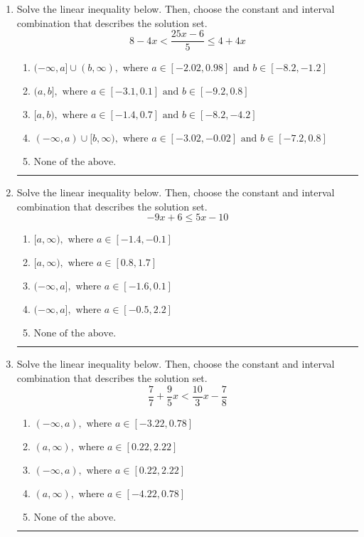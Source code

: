 \documentclass[14pt]{extbook}
\newcommand{\litem}[1]{\item#1\hspace*{-1cm}\rule{\textwidth}{0.4pt}}
\begin{document}
\begin{enumerate}
\litem{
Solve the linear inequality below. Then, choose the constant and interval combination that describes the solution set.\[ 8 - 4 x < \frac{25 x - 6}{5} \leq 4 + 4 x \]\begin{enumerate}[label=\Alph*.]
\item \( (-\infty, a] \cup (b, \infty), \text{ where } a \in [-2.02, 0.98] \text{ and } b \in [-8.2, -1.2] \)
\item \( (a, b], \text{ where } a \in [-3.1, 0.1] \text{ and } b \in [-9.2, 0.8] \)
\item \( [a, b), \text{ where } a \in [-1.4, 0.7] \text{ and } b \in [-8.2, -4.2] \)
\item \( (-\infty, a) \cup [b, \infty), \text{ where } a \in [-3.02, -0.02] \text{ and } b \in [-7.2, 0.8] \)
\item \( \text{None of the above.} \)

\end{enumerate} }
\litem{
Solve the linear inequality below. Then, choose the constant and interval combination that describes the solution set.\[ -9x + 6 \leq 5x -10 \]\begin{enumerate}[label=\Alph*.]
\item \( [a, \infty), \text{ where } a \in [-1.4, -0.1] \)
\item \( [a, \infty), \text{ where } a \in [0.8, 1.7] \)
\item \( (-\infty, a], \text{ where } a \in [-1.6, 0.1] \)
\item \( (-\infty, a], \text{ where } a \in [-0.5, 2.2] \)
\item \( \text{None of the above}. \)

\end{enumerate} }
\litem{
Solve the linear inequality below. Then, choose the constant and interval combination that describes the solution set.\[ \frac{7}{7} + \frac{9}{5} x < \frac{10}{3} x - \frac{7}{8} \]\begin{enumerate}[label=\Alph*.]
\item \( (-\infty, a), \text{ where } a \in [-3.22, 0.78] \)
\item \( (a, \infty), \text{ where } a \in [0.22, 2.22] \)
\item \( (-\infty, a), \text{ where } a \in [0.22, 2.22] \)
\item \( (a, \infty), \text{ where } a \in [-4.22, 0.78] \)
\item \( \text{None of the above}. \)


\end{enumerate}}
\end{enumerate}
\end{document}

